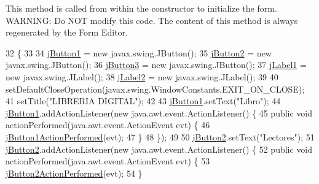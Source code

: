 This method is called from within the constructor to initialize the form. W\+A\+R\+N\+I\+NG\+: Do N\+OT modify this code. The content of this method is always regenerated by the Form Editor. 
\begin{DoxyCode}
32                                   \{
33 
34         \mbox{\hyperlink{class_interfaz_package_1_1_interfaz_comprar_ab2d3c9abb855370537718c51d54c4a83}{jButton1}} = \textcolor{keyword}{new} javax.swing.JButton();
35         \mbox{\hyperlink{class_interfaz_package_1_1_interfaz_comprar_a60c822302c1ba43e1ab6a812bfc0881b}{jButton2}} = \textcolor{keyword}{new} javax.swing.JButton();
36         \mbox{\hyperlink{class_interfaz_package_1_1_interfaz_comprar_addad0d7464d6b4d8ce1a868d0b289a13}{jButton3}} = \textcolor{keyword}{new} javax.swing.JButton();
37         \mbox{\hyperlink{class_interfaz_package_1_1_interfaz_comprar_a59aeb61174932ff58c3f19f7e92450df}{jLabel1}} = \textcolor{keyword}{new} javax.swing.JLabel();
38         \mbox{\hyperlink{class_interfaz_package_1_1_interfaz_comprar_a3ae8bac05864b4e4109e88784240a350}{jLabel2}} = \textcolor{keyword}{new} javax.swing.JLabel();
39 
40         setDefaultCloseOperation(javax.swing.WindowConstants.EXIT\_ON\_CLOSE);
41         setTitle(\textcolor{stringliteral}{"LIBRERIA DIGITAL"});
42 
43         \mbox{\hyperlink{class_interfaz_package_1_1_interfaz_comprar_ab2d3c9abb855370537718c51d54c4a83}{jButton1}}.setText(\textcolor{stringliteral}{"Libro"});
44         \mbox{\hyperlink{class_interfaz_package_1_1_interfaz_comprar_ab2d3c9abb855370537718c51d54c4a83}{jButton1}}.addActionListener(\textcolor{keyword}{new} java.awt.event.ActionListener() \{
45             \textcolor{keyword}{public} \textcolor{keywordtype}{void} actionPerformed(java.awt.event.ActionEvent evt) \{
46                 \mbox{\hyperlink{class_interfaz_package_1_1_interfaz_comprar_aedd6af08b9d86de535615bdf8e6d63ae}{jButton1ActionPerformed}}(evt);
47             \}
48         \});
49 
50         \mbox{\hyperlink{class_interfaz_package_1_1_interfaz_comprar_a60c822302c1ba43e1ab6a812bfc0881b}{jButton2}}.setText(\textcolor{stringliteral}{"Lectores"});
51         \mbox{\hyperlink{class_interfaz_package_1_1_interfaz_comprar_a60c822302c1ba43e1ab6a812bfc0881b}{jButton2}}.addActionListener(\textcolor{keyword}{new} java.awt.event.ActionListener() \{
52             \textcolor{keyword}{public} \textcolor{keywordtype}{void} actionPerformed(java.awt.event.ActionEvent evt) \{
53                 \mbox{\hyperlink{class_interfaz_package_1_1_interfaz_comprar_addcea73314639a2e954a8993777bc6c6}{jButton2ActionPerformed}}(evt);
54             \}

\end{DoxyCode}

